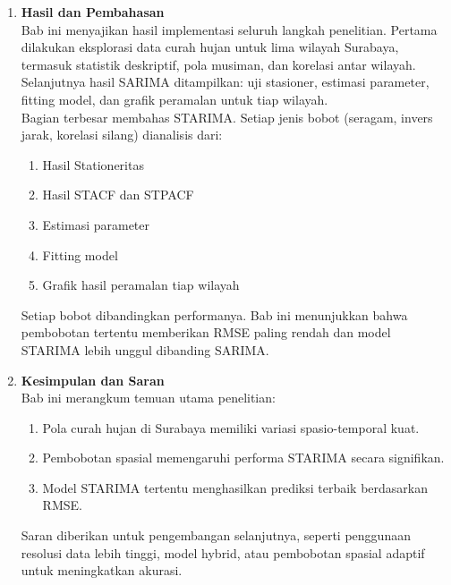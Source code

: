 \begin{enumerate}
    Analisis eksploratif mencakup visualisasi pola spasial dan temporal. Setelah itu dilakukan uji kestasioneran, pembentukan tiga jenis Spatial Weight Matrix, serta pembangunan model baseline SARIMA.
    Setelah SARIMA, dibangun model STARIMA dengan tiga jenis bobot: seragam, invers jarak, dan korelasi silang.
    Bab ini ditutup dengan penjelasan teknik evaluasi menggunakan RMSE serta tujuan akhir peramalan.
    \item \textbf{Hasil dan Pembahasan} \\
    Bab ini menyajikan hasil implementasi seluruh langkah penelitian.
    Pertama dilakukan eksplorasi data curah hujan untuk lima wilayah Surabaya, termasuk statistik deskriptif, pola musiman, dan korelasi antar wilayah.
    Selanjutnya hasil SARIMA ditampilkan: uji stasioner, estimasi parameter, fitting model, dan grafik peramalan untuk tiap wilayah. \\
    Bagian terbesar membahas STARIMA. Setiap jenis bobot (seragam, invers jarak, korelasi silang) dianalisis dari:
    \begin{enumerate}[label=\alph*.]
        \item Hasil Stationeritas
        \item Hasil STACF dan STPACF
        \item Estimasi parameter
        \item Fitting model
        \item Grafik hasil peramalan tiap wilayah
    \end{enumerate}
    Setiap bobot dibandingkan performanya.
    Bab ini menunjukkan bahwa pembobotan tertentu memberikan RMSE paling rendah dan model STARIMA lebih unggul dibanding SARIMA.
    \item \textbf{Kesimpulan dan Saran} \\
    Bab ini merangkum temuan utama penelitian:
    \begin{enumerate}[label=\alph*.]
        \item Pola curah hujan di Surabaya memiliki variasi spasio-temporal kuat.
        \item Pembobotan spasial memengaruhi performa STARIMA secara signifikan.
        \item Model STARIMA tertentu menghasilkan prediksi terbaik berdasarkan RMSE.
    \end{enumerate}
    Saran diberikan untuk pengembangan selanjutnya, seperti penggunaan resolusi data lebih tinggi, model hybrid, atau pembobotan spasial adaptif untuk meningkatkan akurasi.
\end{enumerate}